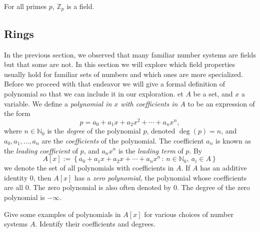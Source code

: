 \documentclass[english,course]{lecture}
\theoremstyle{plain}
\newenvironment{definition}[1]
  {\renewcommand\theinnerdefinition{#1}\innerdefinition}
  {\endinnerdefinition}
\def\setof#1#2{{\left\{#1\,\colon\,#2\right\}}}
\def\Z{{\mathbb Z}}
\def\N{{\mathbb N}}
\def\presnotes{}
\begin{document}
\begin{theorem}
	For all primes $p$, $\Z_p$ is a field.
\end{theorem}

\presnotes


\subsection{Rings}
In the previous section, we observed that many familiar number systems are fields but that some are not. In this section we will explore which field properties usually hold for familiar sets of numbers and which ones are more specialized. Before we proceed with that endeavor we will give a formal definition of polynomial so that we can include it in our exploration.
\begin{definition}
	Let $A$ be a set, and $x$ a variable.
	We define a \emph{polynomial in $x$ with coefficients in $A$} to be an expression of the form
	\[
		p = a_0 + a_1 x + a_2 x^2 + \cdots + a_n x^n,
	\]
	where $n\in \N_0$ is the \emph{degree} of the polynomial $p$, denoted $\deg(p) = n$, and $a_0,a_1,\ldots, a_n$ are the \emph{coefficients} of the polynomial.
	The coefficient $a_n$ is known as the \emph{leading coefficient} of $p$, and $a_n x^n$ is the \emph{leading term} of $p$.
	By
	\[
		A[x] := \setof{a_0 + a_1 x + a_2 x + \cdots + a_n x^n}{n\in \N_0, \ a_i\in A}
	\]
	we denote the set of all polynomials with coefficients in $A$.
	If $A$ has an additive identity $0$, then $A[x]$ has a \emph{zero polynomial}, the polynomial whose coefficients are all $0$.
	The zero polynomial is also often denoted by $0$.
	The degree of the zero polynomial is $-\infty$.
\end{definition}

\begin{exer}
	Give some examples of polynomials in $A[x]$ for various choices of number systems $A$.
	Identify their coefficients and degrees.
\end{exer}

\presnotes
\end{document}
